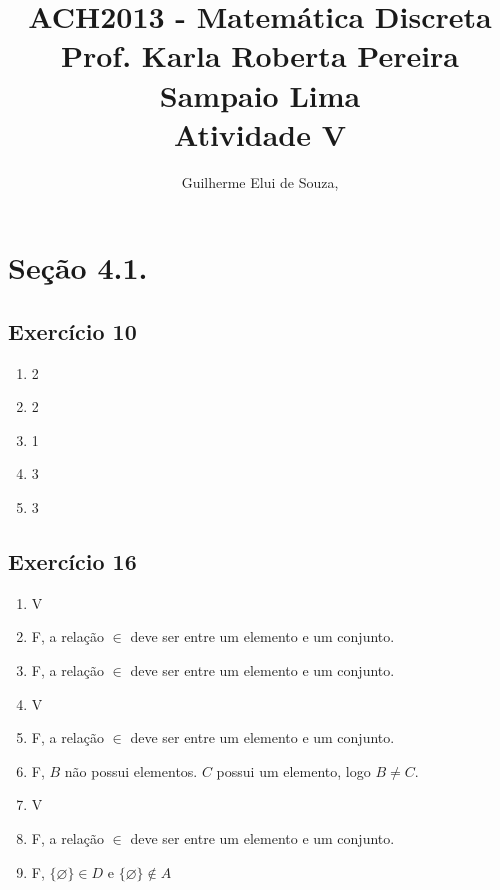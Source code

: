 \documentclass[12pt,a4paper]{article}
\begin{document}
\author{Guilherme Elui de Souza,  }
\title{ACH2013 - Matemática Discreta \\
\large Prof. Karla Roberta Pereira Sampaio Lima \\
\large Atividade V}
\maketitle

\section*{Seção 4.1.}
\subsection*{Exercício 10}
\begin{enumerate}[label=\textbf{\alph*.}]
\item 2 
\item 2
\item 1
\item 3
\item 3
\end{enumerate}
\subsection*{Exercício 16}
\begin{enumerate}[label=\textbf{\alph*.}]
\item V
\item F, \quad a relação $\in$ deve ser entre um elemento e um conjunto.
\item F, \quad a relação $\in$ deve ser entre um elemento e um conjunto.
\item V
\item F, \quad a relação $\in$ deve ser entre um elemento e um conjunto.
\item F, \quad $B$ não possui elementos. $C$ possui um elemento, logo $B \neq C$.
\item V
\item F, \quad a relação $\in$ deve ser entre um elemento e um conjunto.
\item F, \quad $\{{\varnothing}\} \in D$ e $\{{\varnothing}\} \not\in A$
\end{enumerate}
\end{document}
